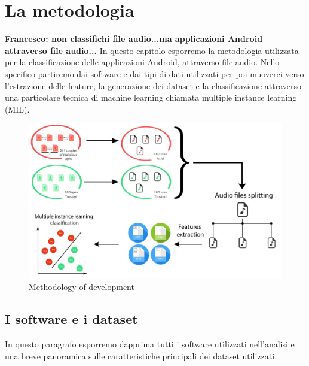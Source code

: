 \chapter{La metodologia}
\label{chap:cap4}
\textbf{Francesco: non classifichi file audio...ma applicazioni Android attraverso file audio...}
In questo capitolo esporremo la metodologia utilizzata per la classificazione delle applicazioni Android, attraverso file audio. Nello specifico partiremo dai software e dai tipi di dati utilizzati per poi muoverci verso l'estrazione delle feature, la generazione dei dataset e la classificazione attraverso una particolare tecnica di machine learning chiamata multiple instance learning (MIL). 
\begin{figure}[h]
\centering
    \includegraphics[width=0.9\linewidth]{imgs/capitolo4/engall.png} 
    \caption{Methodology of development  }
    \label{fig:all}
\end{figure}
\FloatBarrier
\section{I software e i dataset}
In questo paragrafo esporremo dapprima tutti i software utilizzati nell'analisi e una breve panoramica sulle caratteristiche principali dei dataset utilizzati.  
